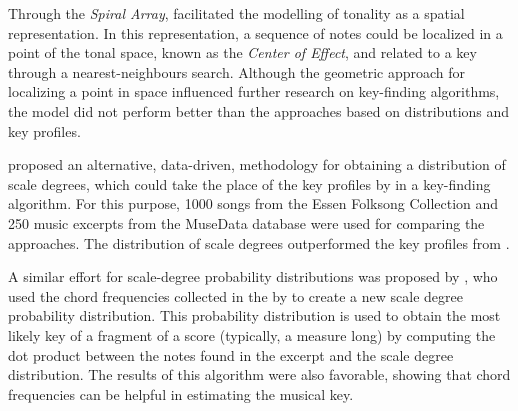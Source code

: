 
Through the \emph{Spiral Array}, \textcite{chew2002spiral}
facilitated the modelling of tonality as a spatial
representation. In this representation, a sequence of notes
could be localized in a point of the tonal space, known as
the \emph{Center of Effect}, and related to a key through a
nearest-neighbours search. Although the geometric approach
for localizing a point in space influenced further research
on key-finding algorithms, the model did not perform better
than the approaches based on distributions and key profiles.


\textcite{aarden2003dynamic} proposed an alternative,
data-driven, methodology for obtaining a distribution of
scale degrees, which could take the place of the key
profiles by \textcite{krumhansl1982tracing} in a key-finding
algorithm. For this purpose, 1000 songs from the Essen
Folksong Collection and 250 music excerpts from the MuseData
database were used for comparing the approaches. The
distribution of scale degrees outperformed the key profiles
from \textcite{krumhansl1982tracing}.





A similar effort for scale-degree probability distributions
was proposed by \textcite{bellmann2006about}, who used the
chord frequencies collected in the \thesisdiss by
\textcite{budge1943study} to create a new scale degree
probability distribution. This probability distribution is
used to obtain the most likely key of a fragment of a score
(typically, a measure long) by computing the dot product
between the notes found in the excerpt and the scale degree
distribution. The results of this algorithm were also
favorable, showing that chord frequencies can be helpful in
estimating the musical key.

